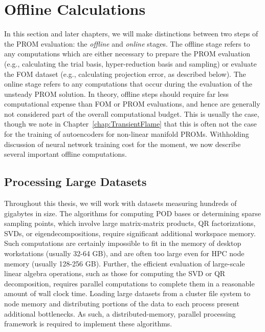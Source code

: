 \section{Offline Calculations}

In this section and later chapters, we will make distinctions between two steps of the PROM evaluation: the \textit{offline} and \textit{online} stages. The offline stage refers to any computations which are either necessary to prepare the PROM evaluation (e.g., calculating the trial basis, hyper-reduction basis and sampling) or evaluate the FOM dataset (e.g., calculating projection error, as described below). The online stage refers to any computations that occur during the evaluation of the unsteady PROM solution. In theory, offline steps should require far less computational expense than FOM or PROM evaluations, and hence are generally not considered part of the overall computational budget. This is usually the case, though we note in Chapter~\ref{chap:TransientFlame} that this is often not the case for the training of autoencoders for non-linear manifold PROMs. Withholding discussion of neural network training cost for the moment, we now describe several important offline computations.


\subsection{Processing Large Datasets}\label{sec:platform}
%
Throughout this thesis, we will work with datasets measuring hundreds of gigabytes in size. The algorithms for computing POD bases or determining sparse sampling points, which involve large matrix-matrix products, QR factorizations, SVDs, or eigendecompositions, require significant additional workspace memory. Such computations are certainly impossible to fit in the memory of desktop workstations (usually 32-64 GB), and are often too large even for HPC node memory (usually 128-256 GB). Further, the efficient evaluation of large-scale linear algebra operations, such as those for computing the SVD or QR decomposition, requires parallel computations to complete them in a reasonable amount of wall clock time. Loading large datasets from a cluster file system to node memory and distributing portions of the data to each process present additional bottlenecks. As such, a distributed-memory, parallel processing framework is required to implement these algorithms.

